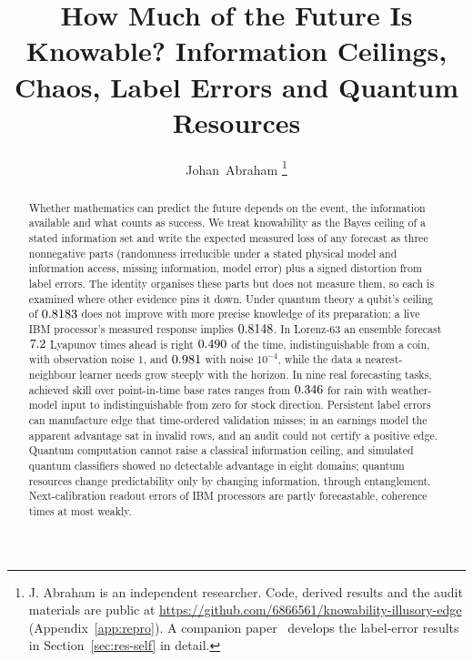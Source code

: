 \documentclass[journal]{IEEEtran}
\theoremstyle{definition}
\begin{document}
\title{How Much of the Future Is Knowable? Information Ceilings, Chaos, Label Errors and Quantum Resources}

\author{Johan~Abraham%
\thanks{J. Abraham is an independent researcher. Code, derived results and the audit materials are public at \url{https://github.com/6866561/knowability-illusory-edge} (Appendix~\ref{app:repro}). A companion paper~\cite{abraham2026illusory} develops the label-error results in Section~\ref{sec:res-self} in detail.}}


\maketitle

\begin{abstract}
Whether mathematics can predict the future depends on the event, the information available and what counts as success. We treat knowability as the Bayes ceiling of a stated information set and write the expected measured loss of any forecast as three nonnegative parts (randomness irreducible under a stated physical model and information access, missing information, model error) plus a signed distortion from label errors. The identity organises these parts but does not measure them, so each is examined where other evidence pins it down. Under quantum theory a qubit's ceiling of $0.8183$ does not improve with more precise knowledge of its preparation; a live IBM processor's measured response implies $0.8148$. In Lorenz-63 an ensemble forecast $7.2$ Lyapunov times ahead is right $0.490$ of the time, indistinguishable from a coin, with observation noise $1$, and $0.981$ with noise $10^{-4}$, while the data a nearest-neighbour learner needs grow steeply with the horizon. In nine real forecasting tasks, achieved skill over point-in-time base rates ranges from $0.346$ for rain with weather-model input to indistinguishable from zero for stock direction. Persistent label errors can manufacture edge that time-ordered validation misses; in an earnings model the apparent advantage sat in invalid rows, and an audit could not certify a positive edge. Quantum computation cannot raise a classical information ceiling, and simulated quantum classifiers showed no detectable advantage in eight domains; quantum resources change predictability only by changing information, through entanglement. Next-calibration readout errors of IBM processors are partly forecastable, coherence times at most weakly.
\end{abstract}
\end{document}
